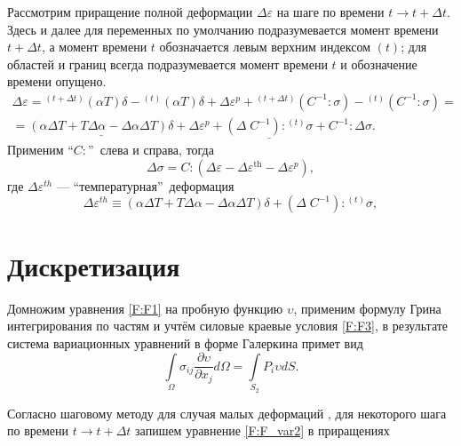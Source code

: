 Рассмотрим приращение полной деформации $\Delta\varepsilon$ на шаге по времени \mbox{$t\longrightarrow t+\Delta t$}. Здесь и далее для переменных по умолчанию подразумевается момент времени $t+\Delta t$, а момент времени $t$ обозначается левым верхним индексом $(t)$; для областей и границ всегда подразумевается момент времени $t$ и обозначение времени опущено.
\begin{equation}
\begin{gathered}
\Delta\varepsilon={}^{(t+\Delta t)}\left(\alpha T\right)\delta-{}^{(t)}\left(\alpha T\right)\delta+\Delta\varepsilon^p+{}^{(t+\Delta t)}\left(C^{-1}:\sigma\right)-{}^{(t)}\left(C^{-1}:\sigma\right)=\\
=\underline{\left(\alpha\Delta T+T\Delta\alpha-\Delta\alpha\Delta T\right)\delta}+\Delta\varepsilon^p+\underline{\left(\Delta\;C^{-1}\right):{}^{(t)}\sigma}+C^{-1}:\Delta\sigma.
\end{gathered}
\end{equation}
Применим \textquotedblleft$C:$\textquotedblright\ слева и справа, тогда
\begin{equation}
\Delta\sigma=C:\left(\Delta\varepsilon-\Delta\varepsilon^{\mathrm{th}}-\Delta\varepsilon^p\right),
\label{F:Hook_increment}
\end{equation}
где $\Delta\varepsilon^{th}$ --- \textquotedblleft температурная\textquotedblright\ деформация
\begin{equation}
\Delta\varepsilon^{th}\equiv\left(\alpha\Delta T+T\Delta\alpha-\Delta\alpha\Delta T\right)\delta+\left(\Delta\;C^{-1}\right):{}^{(t)}\sigma,
\end{equation}



\section{Дискретизация}
Домножим уравнения \eqref{F:F1} на пробную функцию $\upsilon$, применим формулу Грина интегрирования по частям и учтём силовые краевые условия \eqref{F:F3}, в результате система вариационных уравнений в форме Галеркина примет вид \cite{SoloveychikRoyakPersova2007}
\begin{equation}
\int\limits_{\Omega}\sigma_{ij}\frac{\partial\upsilon}{\partial x_j}  d\Omega=\int\limits_{S_{2}}P_{i} \upsilon dS.
\label{F:F_var2}
\end{equation}

Согласно шаговому методу для случая малых деформаций \cite{Zienkiewicz1975,Frolov1995}, для некоторого шага по времени $t\longrightarrow t+\Delta t$ запишем уравнение \eqref{F:F_var2} в приращениях


